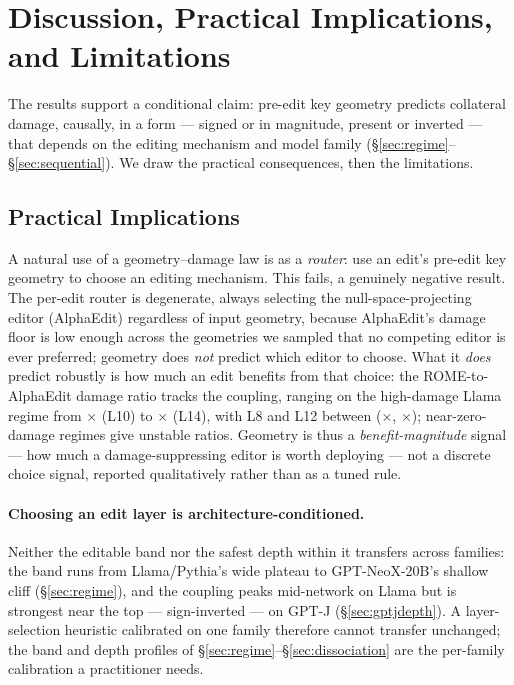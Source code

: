 \section{Discussion, Practical Implications, and Limitations}
\label{sec:discussion}

The results support a conditional claim: pre-edit key geometry predicts
collateral damage, causally, in a form --- signed or in magnitude, present or
inverted --- that depends on the editing mechanism and model family
(\S\ref{sec:regime}--\S\ref{sec:sequential}). We draw the practical
consequences, then the limitations.

\subsection{Practical Implications}
\label{sec:discussion-practical}
A natural use of a geometry--damage law is as a \emph{router}: use an edit's
pre-edit key geometry to choose an editing mechanism. This fails, a genuinely
negative result. The per-edit router is degenerate, always selecting the
null-space-projecting editor (AlphaEdit) regardless of input geometry, because
AlphaEdit's damage floor is low enough across the geometries we sampled that no
competing editor is ever preferred; geometry does \emph{not} predict which
editor to choose. What it \emph{does} predict robustly is how much an edit
benefits from that choice: the ROME-to-AlphaEdit damage ratio tracks the
coupling, ranging on the high-damage Llama regime from \dThreeRatioLten{}$\times$
(L10) to \dThreeRatioLfourteen{}$\times$ (L14), with L8 and L12 between
(\dThreeRatioLeight{}$\times$, \dThreeRatioLtwelve{}$\times$); near-zero-damage
regimes give unstable ratios. Geometry is thus a \emph{benefit-magnitude} signal
--- how much a damage-suppressing editor is worth deploying --- not a discrete
choice signal, reported qualitatively rather than as a tuned rule.

\paragraph{Choosing an edit layer is architecture-conditioned.} Neither the
editable band nor the safest depth within it transfers across families: the
band runs from Llama/Pythia's wide plateau to GPT-NeoX-20B's shallow cliff
(\S\ref{sec:regime}), and the coupling peaks mid-network on Llama but is
strongest near the top --- sign-inverted --- on GPT-J (\S\ref{sec:gptjdepth}).
A layer-selection heuristic calibrated on one family therefore cannot transfer
unchanged; the band and depth profiles of
\S\ref{sec:regime}--\S\ref{sec:dissociation} are the per-family calibration
a practitioner needs.

